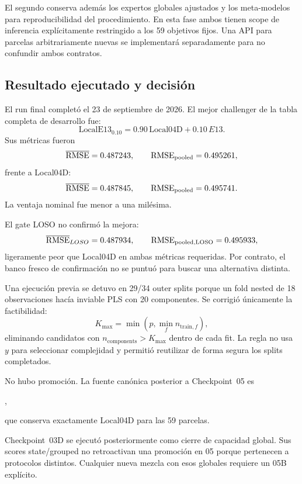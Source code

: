 El segundo conserva además los expertos globales ajustados y los meta-modelos para
reproducibilidad del procedimiento. En esta fase ambos tienen scope de inferencia
explícitamente restringido a los 59 objetivos fijos. Una API para parcelas arbitrariamente
nuevas se implementará separadamente para no confundir ambos contratos.

\subsection{Resultado ejecutado y decisión}

El run final completó el 23 de septiembre de 2026. El mejor challenger de la tabla completa
de desarrollo fue:
\[
\mathrm{LocalE13}_{0.10}
=
0.90\,\mathrm{Local04D}
+
0.10\,E13.
\]
Sus métricas fueron
\[
\overline{\operatorname{RMSE}}=0.487243,
\qquad
\operatorname{RMSE}_{\mathrm{pooled}}=0.495261,
\]
frente a Local04D:
\[
\overline{\operatorname{RMSE}}=0.487845,
\qquad
\operatorname{RMSE}_{\mathrm{pooled}}=0.495741.
\]
La ventaja nominal fue menor a una milésima.

El gate LOSO no confirmó la mejora:
\[
\overline{\operatorname{RMSE}}_{LOSO}=0.487934,
\qquad
\operatorname{RMSE}_{\mathrm{pooled,LOSO}}=0.495933,
\]
ligeramente peor que Local04D en ambas métricas requeridas. Por contrato, el banco fresco de
confirmación no se puntuó para buscar una alternativa distinta.

Una ejecución previa se detuvo en 29/34 outer splits porque un fold nested de 18 observaciones
hacía inviable PLS con 20 componentes. Se corrigió únicamente la factibilidad:
\[
K_{\max}
=
\min\left(p,\min_f n_{\mathrm{train},f}\right),
\]
eliminando candidatos con $n_{\mathrm{components}}>K_{\max}$ dentro de cada fit. La regla no
usa $y$ para seleccionar complejidad y permitió reutilizar de forma segura los splits
completados.

No hubo promoción. La fuente canónica posterior a Checkpoint~05 es
\begin{center}
,
\end{center}
que conserva exactamente Local04D para las 59 parcelas.

Checkpoint~03D se ejecutó posteriormente como cierre de capacidad global. Sus scores
state/grouped no retroactivan una promoción en 05 porque pertenecen a protocolos distintos.
Cualquier nueva mezcla con esos globales requiere un 05B explícito.
